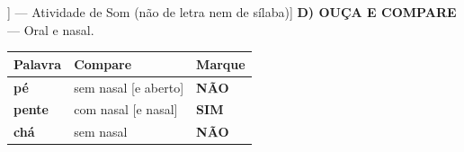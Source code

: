 \begin{exercicio}[Som /e/ nasal [[e~]] --- Atividade de Som (não de letra nem de sílaba)]
\textbf{D) OUÇA E COMPARE} --- Oral e nasal.

\begin{center}
\begin{tabular}{@{}p{4.2cm}p{6.2cm}p{1.6cm}@{}}
\hline
\textbf{Palavra} & \textbf{Compare} & \textbf{Marque} \\
\hline
\textbf{pé} & sem nasal [e aberto] & \textbf{NÃO} \\
\textbf{pente} & com nasal [e nasal] & \textbf{SIM} \\
\textbf{chá} & sem nasal & \textbf{NÃO} \\
\hline
\end{tabular}
\end{center}

\end{exercicio}

